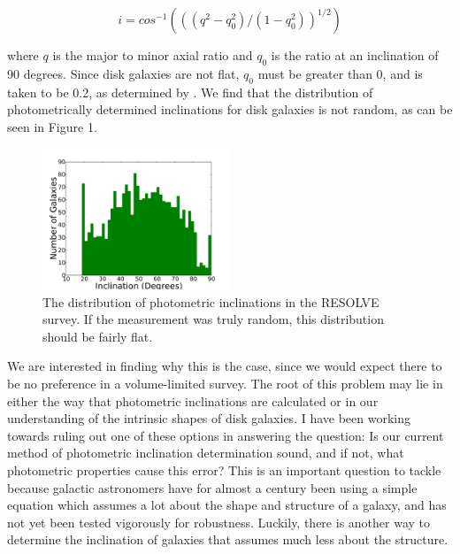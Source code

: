 \documentclass{emulateapj}
\begin{document}
\begin{equation}
i = cos^{-1}(((q^2-q_0^2)/(1-q_0^2))^{1/2})
\end{equation}

\noindent where $q$ is the major to minor axial ratio and $q_0$ is the ratio at an inclination of 90 degrees. Since disk galaxies are not flat, $q_0$ must be greater than 0, and is taken to be 0.2, as determined by \citet{holmberg}. We find that the distribution of photometrically determined inclinations for disk galaxies is not random, as can be seen in Figure 1.

\begin{figure}
\includegraphics[width=0.5\textwidth]{hist1.pdf}
\caption{The distribution of photometric inclinations in the RESOLVE survey. If the measurement was truly random, this distribution should be fairly flat. \label{fig:test}}
\end{figure}

We are interested in finding why this is the case, since we would expect there to be no preference in a volume-limited survey. The root of this problem may lie in either the way that photometric inclinations are calculated or in our understanding of the intrinsic shapes of disk galaxies. I have been working towards ruling out one of these options in answering the question: Is our current method of photometric inclination determination sound, and if not, what photometric properties cause this error? This is an important question to tackle because galactic astronomers have for almost a century been using a simple equation which assumes a lot about the shape and structure of a galaxy, and has not yet been tested vigorously for robustness. Luckily, there is another way to determine the inclination of galaxies that assumes much less about the structure.

\end{document}
